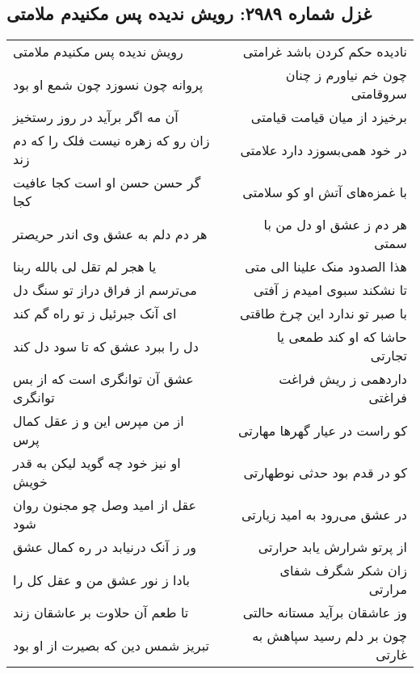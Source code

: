 \begin{center}
\section*{غزل شماره ۲۹۸۹: رویش ندیده پس مکنیدم ملامتی}
\label{sec:2989}
\begin{longtable}{l p{0.5cm} r}
رویش ندیده پس مکنیدم ملامتی
&&
نادیده حکم کردن باشد غرامتی
\\
پروانه چون نسوزد چون شمع او بود
&&
چون خم نیاورم ز چنان سروقامتی
\\
آن مه اگر برآید در روز رستخیز
&&
برخیزد از میان قیامت قیامتی
\\
زان رو که زهره نیست فلک را که دم زند
&&
در خود همی‌بسوزد دارد علامتی
\\
گر حسن حسن او است کجا عافیت کجا
&&
با غمزه‌های آتش او کو سلامتی
\\
هر دم دلم به عشق وی اندر حریصتر
&&
هر دم ز عشق او دل من با سمتی
\\
یا هجر لم تقل لی بالله ربنا
&&
هذا الصدود منک علینا الی متی
\\
می‌ترسم از فراق دراز تو سنگ دل
&&
تا نشکند سبوی امیدم ز آفتی
\\
ای آنک جبرئیل ز تو راه گم کند
&&
با صبر تو ندارد این چرخ طاقتی
\\
دل را ببرد عشق که تا سود دل کند
&&
حاشا که او کند طمعی یا تجارتی
\\
عشق آن توانگری است که از بس توانگری
&&
داردهمی ز ریش فراغت فراغتی
\\
از من مپرس این و ز عقل کمال پرس
&&
کو راست در عیار گهرها مهارتی
\\
او نیز خود چه گوید لیکن به قدر خویش
&&
کو در قدم بود حدثی نوطهارتی
\\
عقل از امید وصل چو مجنون روان شود
&&
در عشق می‌رود به امید زیارتی
\\
ور ز آنک درنیابد در ره کمال عشق
&&
از پرتو شرارش یابد حرارتی
\\
بادا ز نور عشق من و عقل کل را
&&
زان شکر شگرف شفای مرارتی
\\
تا طعم آن حلاوت بر عاشقان زند
&&
وز عاشقان برآید مستانه حالتی
\\
تبریز شمس دین که بصیرت از او بود
&&
چون بر دلم رسید سپاهش به غارتی
\\
\end{longtable}
\end{center}
